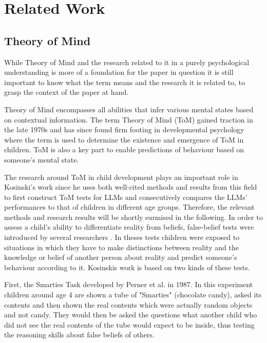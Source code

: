 \section{Related Work}
\subsection{Theory of Mind}
While Theory of Mind and the research related to it in a purely psychological understanding is more of a foundation for the paper in question it is still important to know what the term means and the research it is related to, to grasp the context of the paper at hand.

Theory of Mind encompasses all abilities that infer various mental states based on contextual information. The term Theory of Mind (ToM) gained traction in the late 1970s and has since found firm footing in developmental psychology where the term is used to determine the existence and emergence of ToM in children. ToM is also a key part to enable predictions of behaviour based on someone's mental state.\cite{theory_of_mind}

The research around ToM in child development plays an important role in Kosinski's work since he uses both well-cited methods and results from this field to first construct ToM tests for LLMs and consecutively compares the LLMs' performances to that of children in different age groups. Therefore, the relevant methods and research results will be shortly surmised in the following. In order to assess a child's ability to differentiate reality from beliefs, false-belief tests were introduced by several researchers \cite{fb_test_places_1,fb_test_places_2,fb_test_contents}. In theses tests children were exposed to situations in which they have to make distinctions between reality and the knowledge or belief of another person about reality and predict someone's behaviour according to it. Kosinskis work is based on two kinds of these tests.

First, the Smarties Task developed by Perner et al. in 1987. In this experiment children around age 4 are shown a tube of "Smarties" (chocolate candy), asked its contents and then shown the real contents which were actually random objects and not candy. They would then be asked the questions what another child who did not see the real contents of the tube would expect to be inside, thus testing the reasoning skills about false beliefs of others. \cite{fb_test_contents}


